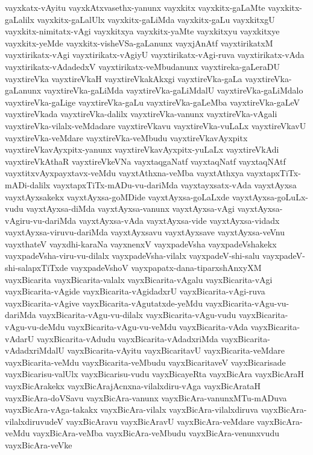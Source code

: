 {vayxkatx-vAyitu
vayxkAtxvasethx-yanunx
vayxkitx
vayxkitx-gaLaMte
vayxkitx-gaLalilx
vayxkitx-gaLalUlx
vayxkitx-gaLiMda
vayxkitx-gaLu
vayxkitxgU
vayxkitx-nimitatx-vAgi
vayxkitxya
vayxkitx-yaMte
vayxkitxyu
vayxkitxye
vayxkitx-yeMde
vayxkitx-visheVSa-gaLanunx
vayxjAnAtf
vayxtirikatxM
vayxtirikatx-vAgi
vayxtirikatx-vAgiyU
vayxtirikatx-vAgi-ruva
vayxtirikatx-vAda
vayxtirikatx-vAdadedxV
vayxtirikatx-veMbudanunx
vayxtireka-gaLeraDU
vayxtireVka
vayxtireVkaH
vayxtireVkakAkxgi
vayxtireVka-gaLa
vayxtireVka-gaLanunx
vayxtireVka-gaLiMda
vayxtireVka-gaLiMdalU
vayxtireVka-gaLiMdalo
vayxtireVka-gaLige
vayxtireVka-gaLu
vayxtireVka-gaLeMba
vayxtireVka-gaLeV
vayxtireVkada
vayxtireVka-dalilx
vayxtireVka-vanunx
vayxtireVka-vAgali
vayxtireVka-vilalx-veMdadare
vayxtireVkavu
vayxtireVka-vuLaLx
vayxtireVkavU
vayxtireVka-veMdare
vayxtireVka-veMbudu
vayxtireVkavAyxpitx
vayxtireVkavAyxpitx-yanunx
vayxtireVkavAyxpitx-yuLaLx
vayxtireVkAdi
vayxtireVkAthaR
vayxtireVkeVNa
vayxtaqgaNatf
vayxtaqNatf
vayxtaqNAtf
vayxtitxvAyxpayxtavx-veMdu
vayxtAthxna-veMba
vayxtAthxya
vayxtapxTiTx-mADi-dalilx
vayxtapxTiTx-mADu-vu-dariMda
vayxtayxsatx-vAda
vayxtAyxsa
vayxtAyxsakekx
vayxtAyxsa-goMDide
vayxtAyxsa-goLaLxde
vayxtAyxsa-goLuLx-vudu
vayxtAyxsa-diMda
vayxtAyxsa-vanunx
vayxtAyxsa-vAgi
vayxtAyxsa-vAgiru-vu-dariMda
vayxtAyxsa-vAda
vayxtAyxsa-vide
vayxtAyxsa-vidadx
vayxtAyxsa-viruvu-dariMda
vayxtAyxsavu
vayxtAyxsave
vayxtAyxsa-veVnu
vayxthateV
vayxdhi-karaNa
vayxnenxV
vayxpadeVsha
vayxpadeVshakekx
vayxpadeVsha-viru-vu-dilalx
vayxpadeVsha-vilalx
vayxpadeV-shi-salu
vayxpadeV-shi-salapxTiTxde
vayxpadeVshoV
vayxpapatx-dana-tiparxshAnxyXM
vayxBicarita
vayxBicarita-valalx
vayxBicarita-vAgalu
vayxBicarita-vAgi
vayxBicarita-vAgide
vayxBicarita-vAgidadxrU
vayxBicarita-vAgi-ruva
vayxBicarita-vAgive
vayxBicarita-vAgutatxde-yeMdu
vayxBicarita-vAgu-vu-dariMda
vayxBicarita-vAgu-vu-dilalx
vayxBicarita-vAgu-vudu
vayxBicarita-vAgu-vu-deMdu
vayxBicarita-vAgu-vu-veMdu
vayxBicarita-vAda
vayxBicarita-vAdarU
vayxBicarita-vAdudu
vayxBicarita-vAdadxriMda
vayxBicarita-vAdadxriMdalU
vayxBicarita-vAyitu
vayxBicaritavU
vayxBicarita-veMdare
vayxBicarita-veMdu
vayxBicarita-veMbudu
vayxBicaritaveV
vayxBicarisade
vayxBicarisu-valUlx
vayxBicarisu-vudu
vayxBicayeRta
vayxBicAra
vayxBicAraH
vayxBicArakekx
vayxBicArajAcnxna-vilalxdiru-vAga
vayxBicArataH
vayxBicAra-doVSavu
vayxBicAra-vanunx
vayxBicAra-vanunxMTu-mADuva
vayxBicAra-vAga-takakx
vayxBicAra-vilalx
vayxBicAra-vilalxdiruva
vayxBicAra-vilalxdiruvudeV
vayxBicAravu
vayxBicAravU
vayxBicAra-veMdare
vayxBicAra-veMdu
vayxBicAra-veMba
vayxBicAra-veMbudu
vayxBicAra-venunxvudu
vayxBicAra-veVke
}
